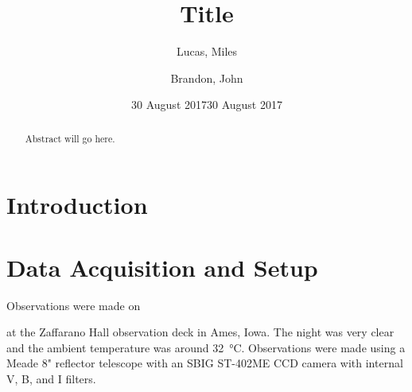 \documentclass[%
aip,
jmp,
reprint,
]{revtex4-1}
\begin{document}
	
	\title[Short title]{Title}
	
	\author{Lucas, Miles}
	\author{Brandon, John}
	
	\date{30 August 2017}
	
	

	\begin{abstract}
	
	Abstract will go here.
		
	\end{abstract}
	
	\maketitle
	

	\section{Introduction}
	
	


	\section{Data Acquisition and Setup}
	Observations were made on \date{30 August 2017} at the Zaffarano Hall observation deck in Ames, Iowa. The night was very clear and the ambient temperature was around \SI{32}{\degreeCelsius}. Observations were made using a Meade 8" reflector telescope with an SBIG ST-402ME CCD camera with internal V, B, and I filters. 
	
\end{document}
